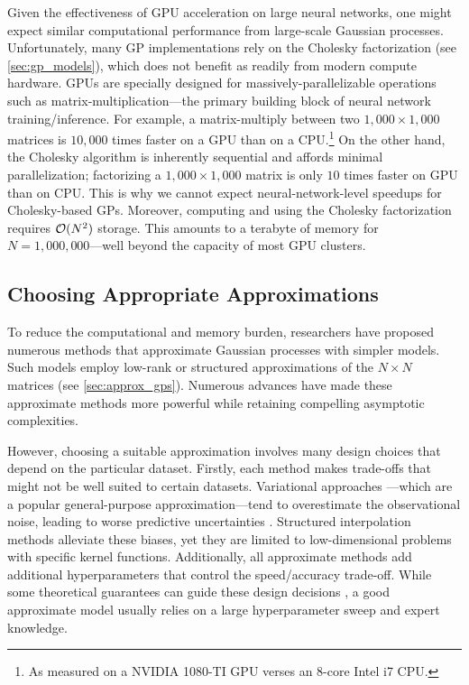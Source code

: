 Given the effectiveness of GPU acceleration on large neural networks, one might expect similar computational performance from large-scale Gaussian processes.
Unfortunately, many GP implementations rely on the Cholesky factorization (see \cref{sec:gp_models}), which does not benefit as readily from modern compute hardware.
GPUs are specially designed for massively-parallelizable operations such as matrix-multiplication---the primary building block of neural network training/inference.
For example, a matrix-multiply between two $1,\!000 \times 1,\!000$ matrices is $10,\!000$ times faster on a GPU than on a CPU.\footnote{
	As measured on a NVIDIA 1080-TI GPU verses an 8-core Intel i7 CPU.
}
On the other hand, the Cholesky algorithm is inherently sequential and affords minimal parallelization;
factorizing a $1,\!000 \times 1,\!000$ matrix is only $10$ times faster on GPU than on CPU.
This is why we cannot expect neural-network-level speedups for Cholesky-based GPs.
Moreover, computing and using the Cholesky factorization requires $\bigo{N^2}$ storage.
This amounts to a terabyte of memory for $N=1,\!000,\!000$---well beyond the capacity of most GPU clusters.

\subsection{Choosing Appropriate Approximations}
To reduce the computational and memory burden, researchers have proposed numerous methods that approximate Gaussian processes with simpler models.
Such models employ low-rank or structured approximations of the $N \times N$ matrices (see \cref{sec:approx_gps}).
Numerous advances have made these approximate methods more powerful while retaining compelling asymptotic complexities.

However, choosing a suitable approximation involves many design choices that depend on the particular dataset.
Firstly, each method makes trade-offs that might not be well suited to certain datasets.
Variational approaches \cite{titsias2009variational}---which are a popular general-purpose approximation---tend to overestimate the observational noise, leading to worse predictive uncertainties \cite{turner2011two,bauer2016understanding}.
Structured interpolation methods \cite{wilson2015kernel} alleviate these biases, yet they are limited to low-dimensional problems with specific kernel functions.
Additionally, all approximate methods add additional hyperparameters that control the speed/accuracy trade-off.
While some theoretical guarantees can guide these design decisions \cite{wilson2015thoughts,burt2019rates}, a good approximate model usually relies on a large hyperparameter sweep and expert knowledge.

